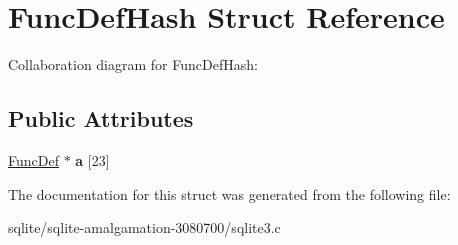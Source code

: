 \hypertarget{struct_func_def_hash}{\section{Func\+Def\+Hash Struct Reference}
\label{struct_func_def_hash}
}


Collaboration diagram for Func\+Def\+Hash\+:
\subsection*{Public Attributes}
\begin{DoxyCompactItemize}
\item 
\hypertarget{struct_func_def_hash_a3e044ccfe432770ef7297e86e405cc96}{\hyperlink{struct_func_def}{Func\+Def} $\ast$ {\bfseries a} \mbox{[}23\mbox{]}}\label{struct_func_def_hash_a3e044ccfe432770ef7297e86e405cc96}

\end{DoxyCompactItemize}


The documentation for this struct was generated from the following file\+:\begin{DoxyCompactItemize}
\item 
sqlite/sqlite-\/amalgamation-\/3080700/sqlite3.\+c\end{DoxyCompactItemize}

